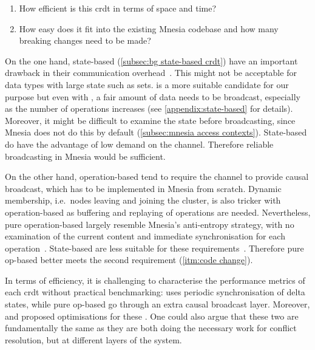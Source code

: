 \begin{enumerate} [label={Fac\arabic*.},ref={Fac\arabic*}]
  \item How efficient is this \acrshort{crdt} in terms of space and time?
  \item How easy does it fit into the existing Mnesia codebase
  and how many breaking changes need to be made? \label{itm:code change}
\end{enumerate}

On the one hand, state-based  (\cref{subsec:bg state-based crdt}) 
have an important drawback in their communication
overhead~\cite{almeida2018DeltaCRDT}. This might not be acceptable for data types 
with large state such as sets.  is a more suitable candidate for our 
purpose but even with , a fair amount
of data needs to be broadcast, especially as the number of operations increases
(see \cref{appendix:state-based} for details). Moreover, it might be difficult to 
examine the state before broadcasting, since Mnesia does not do this by 
default (\cref{subsec:mnesia access contexts}).
State-based  do have the advantage of low demand 
on the channel. Therefore reliable broadcasting in Mnesia would be sufficient.
 

On the other hand, operation-based  tend to require the channel
to provide causal broadcast, which has to be implemented in Mnesia from scratch.
Dynamic membership, i.e.\
nodes leaving and joining the cluster, is also tricker with operation-based
 as buffering and replaying of operations are needed. Nevertheless,
pure operation-based \acrshortpl{crdt} largely resemble Mnesia's anti-entropy strategy,
with no examination of the current content and immediate synchronisation
for each operation~\cite{mattsson2009impltxt}. 
State-based  are less suitable for these requirements~\cite{preguica2018CRDT}. 
Therefore pure op-based \acrshortpl{crdt} better meets the second 
requirement (\cref{itm:code change}).

In terms of efficiency, it is challenging to characterise the performance metrics
of each \acrshort{crdt} without practical benchmarking:
 uses periodic synchronisation of delta states, while
pure op-based \acrshortpl{crdt} go through an extra causal broadcast layer.
Moreover, \citet{almeida2018DeltaCRDT} and \citet{baquero2017PureOp}
proposed optimisations for these . One could
also argue that these two \acrshortpl{crdt} are fundamentally the same as they
are both doing the necessary work for conflict resolution, but at different
layers of the system.

